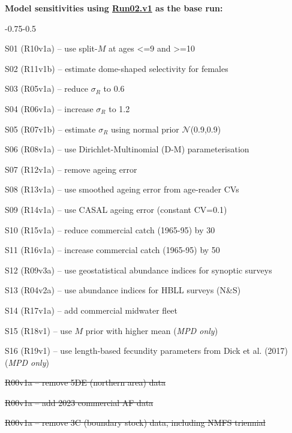 \textbf{Model sensitivities using \hyperlink{R02}{Run02.v1} as the base run:}
\begin{enumerate_csas}{-0.75}{-0.5}
	\item S01 (R10v1a) -- use split-$M$ at ages <=9 and >=10
	\item S02 (R11v1b) -- estimate dome-shaped selectivity for females
	\item S03 (R05v1a) -- reduce $\sigma_R$ to 0.6
	\item S04 (R06v1a) -- increase $\sigma_R$ to 1.2
	\item S05 (R07v1b) -- estimate $\sigma_R$ using normal prior $\mathcal{N}$(0.9,0.9)
	\item S06 (R08v1a) -- use Dirichlet-Multinomial (D-M) parameterisation
	\item S07 (R12v1a) -- remove ageing error
	\item S08 (R13v1a) -- use smoothed ageing error from age-reader CVs
	\item S09 (R14v1a) -- use CASAL ageing error (constant CV=0.1)
	\item S10 (R15v1a) -- reduce commercial catch (1965-95) by 30\pc{}
	\item S11 (R16v1a) -- increase commercial catch (1965-95) by 50\pc{}
	\item S12 (R09v3a) -- use geostatistical abundance indices for synoptic surveys
	\item S13 (R04v2a) -- use abundance indices for HBLL surveys (N\&S)
	\item S14 (R17v1a) -- add commercial midwater fleet
	\item S15 (R18v1) -- use $M$ prior with higher mean (\emph{MPD only})
	\item S16 (R19v1) -- use length-based fecundity parameters from Dick et al. (2017) (\emph{MPD only})
	\item \st{R00v1a -- remove 5DE (northern area) data}
	\item \st{R00v1a -- add 2023 commercial AF data}
	\item \st{R00v1a -- remove 3C (boundary stock) data, including NMFS triennial}
\end{enumerate_csas}
